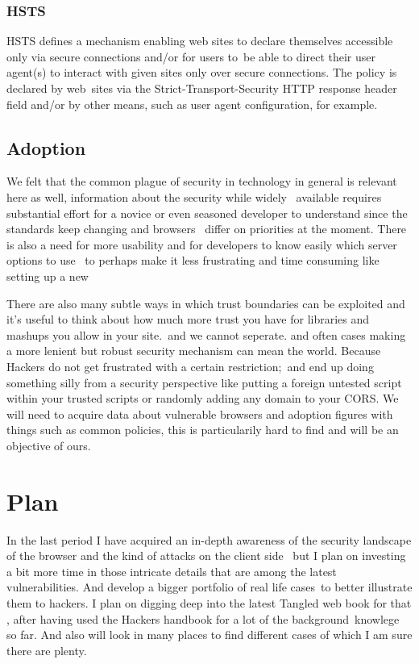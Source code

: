 \documentclass[a4paper,12pt]{paper}
\begin{document}
\subsubsection{HSTS}

HSTS defines a mechanism enabling web sites to declare themselves accessible only via secure connections and/or for users to\
be able to direct their user agent(s) to interact with given sites only over secure connections. The policy is declared by web\
sites via the Strict-Transport-Security HTTP response header field and/or by other means, such as user agent configuration, for example.\\

\subsection{Adoption}

We felt that the common plague of security in technology in general is relevant here as well, information about the security while widely \
available requires substantial effort for a novice or even seasoned developer to understand since the standards keep changing and browsers \
differ on priorities at the moment. There is also a need for more usability and for developers to know easily which server options to use \
to perhaps make it less frustrating and time consuming like setting up a new 

There are also many subtle ways in which trust boundaries can be exploited and it's useful to think about how much more trust you have for libraries and mashups you allow in your site.\
and we cannot seperate. and often cases making a more lenient but robust security mechanism can mean the world. Because Hackers do not get frustrated with a certain restriction;\
and end up doing something silly from a security perspective like putting a foreign untested script within your trusted scripts or randomly adding any domain to your CORS.
We will need to acquire data about vulnerable browsers and adoption figures with things such as common policies, this is particularily hard to find and will be an objective of ours.\

\section{Plan}


In the last period I have acquired an in-depth awareness of the security landscape of the browser and the kind of attacks on the client side \
but I plan on investing a bit more time in those intricate details that are among the latest vulnerabilities. And develop a bigger portfolio of real life cases\
to better illustrate them to hackers. I plan on digging deep into the latest Tangled web book for that , after having used the Hackers handbook for a lot of the background\
knowlege so far. And also will look in many places to find different cases of which I am sure there are plenty.\\
  
\end{document}
